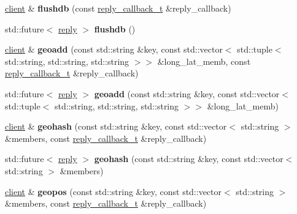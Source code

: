 \begin{DoxyCompactItemize}
\mbox{\hyperlink{classcpp__redis_1_1client}{client}} \& {\bfseries flushdb} (const \mbox{\hyperlink{classcpp__redis_1_1client_af7a65eb21aa25230bfbb0b0203c4fc04}{reply\+\_\+callback\+\_\+t}} \&reply\+\_\+callback)
\item 
\mbox{\label{classcpp__redis_1_1client_acd8cea192338f42f601ea8fce5c8048c}} 
std\+::future$<$ \mbox{\hyperlink{classcpp__redis_1_1reply}{reply}} $>$ {\bfseries flushdb} ()
\item 
\mbox{\label{classcpp__redis_1_1client_acb21c6730ed40799cef06315db231409}} 
\mbox{\hyperlink{classcpp__redis_1_1client}{client}} \& {\bfseries geoadd} (const std\+::string \&key, const std\+::vector$<$ std\+::tuple$<$ std\+::string, std\+::string, std\+::string $>$$>$ \&long\+\_\+lat\+\_\+memb, const \mbox{\hyperlink{classcpp__redis_1_1client_af7a65eb21aa25230bfbb0b0203c4fc04}{reply\+\_\+callback\+\_\+t}} \&reply\+\_\+callback)
\item 
\mbox{\label{classcpp__redis_1_1client_a6e4bebc3a7935bd749f2b4a6bfbb6c22}} 
std\+::future$<$ \mbox{\hyperlink{classcpp__redis_1_1reply}{reply}} $>$ {\bfseries geoadd} (const std\+::string \&key, const std\+::vector$<$ std\+::tuple$<$ std\+::string, std\+::string, std\+::string $>$$>$ \&long\+\_\+lat\+\_\+memb)
\item 
\mbox{\label{classcpp__redis_1_1client_a37b20a863f276469d12dc47063d56055}} 
\mbox{\hyperlink{classcpp__redis_1_1client}{client}} \& {\bfseries geohash} (const std\+::string \&key, const std\+::vector$<$ std\+::string $>$ \&members, const \mbox{\hyperlink{classcpp__redis_1_1client_af7a65eb21aa25230bfbb0b0203c4fc04}{reply\+\_\+callback\+\_\+t}} \&reply\+\_\+callback)
\item 
\mbox{\label{classcpp__redis_1_1client_ac421d4e696a67c1295a6b55ceaeab680}} 
std\+::future$<$ \mbox{\hyperlink{classcpp__redis_1_1reply}{reply}} $>$ {\bfseries geohash} (const std\+::string \&key, const std\+::vector$<$ std\+::string $>$ \&members)
\item 
\mbox{\label{classcpp__redis_1_1client_ae4bba1470cf357a8c4d1f8360a9c8b79}} 
\mbox{\hyperlink{classcpp__redis_1_1client}{client}} \& {\bfseries geopos} (const std\+::string \&key, const std\+::vector$<$ std\+::string $>$ \&members, const \mbox{\hyperlink{classcpp__redis_1_1client_af7a65eb21aa25230bfbb0b0203c4fc04}{reply\+\_\+callback\+\_\+t}} \&reply\+\_\+callback)

\end{DoxyCompactItemize}
